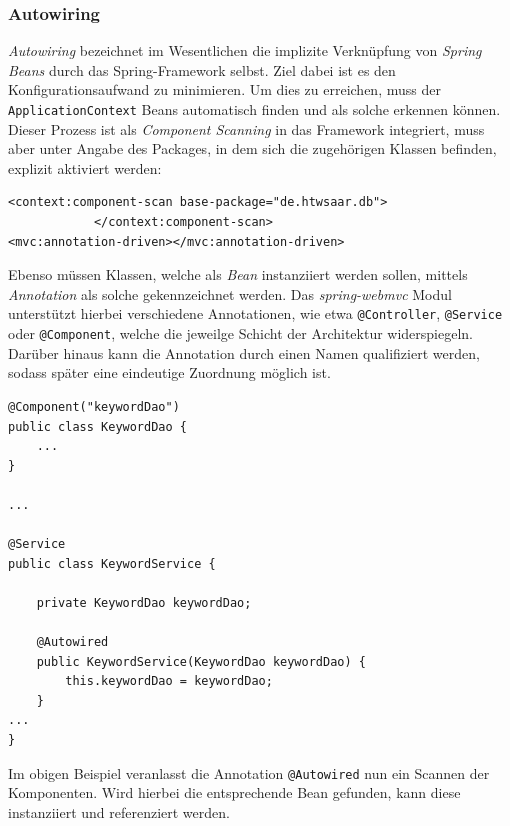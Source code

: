 \subsubsection*{Autowiring}
\textit{Autowiring} bezeichnet im Wesentlichen die implizite Verknüpfung von \textit{Spring Beans} durch das Spring-Framework selbst. Ziel dabei ist es den Konfigurationsaufwand zu minimieren. Um dies zu erreichen, muss der \texttt{ApplicationContext} Beans automatisch finden und als solche erkennen können. Dieser Prozess ist als \textit{Component Scanning} in das Framework integriert, muss aber unter Angabe des Packages, in dem sich die zugehörigen Klassen befinden, explizit aktiviert werden:
\medskip
\begin{lstlisting}[style=XML]
<context:component-scan base-package="de.htwsaar.db">
			</context:component-scan>
<mvc:annotation-driven></mvc:annotation-driven>
\end{lstlisting} 
\medskip 
Ebenso müssen Klassen, welche als \textit{Bean} instanziiert werden sollen, mittels \textit{Annotation} als solche gekennzeichnet werden. Das \textit{spring-webmvc} Modul unterstützt hierbei verschiedene Annotationen, wie etwa \texttt{@Controller}, \texttt{@Service} oder \texttt{@Component}, welche die jeweilge Schicht der Architektur widerspiegeln. Darüber hinaus kann die Annotation durch einen Namen qualifiziert werden, sodass später eine eindeutige Zuordnung möglich ist.
\medskip
\begin{lstlisting}[style=Java]
@Component("keywordDao")
public class KeywordDao { 
	...
}

...

@Service
public class KeywordService {

	private KeywordDao keywordDao;

	@Autowired
	public KeywordService(KeywordDao keywordDao) {
		this.keywordDao = keywordDao;
	}
...
}
\end{lstlisting} 
\medskip 
Im obigen Beispiel veranlasst die Annotation \texttt{@Autowired} nun ein Scannen der Komponenten. Wird hierbei die entsprechende Bean gefunden, kann diese instanziiert und referenziert werden. 
 
